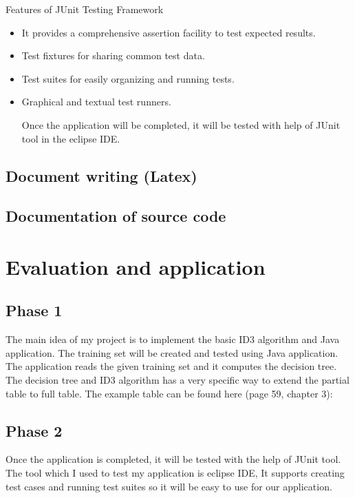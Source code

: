 \documentclass{article}
\begin{document}
Features of JUnit Testing Framework
\begin{itemize}

\item It provides a comprehensive assertion facility to test expected results.
\item Test fixtures for sharing common test data.
\item Test suites for easily organizing and running tests.
\item Graphical and textual test runners.

Once the application will be completed, it will be tested with help of JUnit tool in the eclipse IDE. 


\end{itemize}

\subsection{Document writing (Latex)}
\label{sec:latex}

\subsection{Documentation of source code}
\label{sec:documentsource}


\section{Evaluation and application}
\label{sec:eval}

\subsection{Phase 1}
\label{sec:phase}

The main idea of my project is to implement the basic ID3 algorithm and Java application. The training set will be created and tested using Java application. The application reads the given training set and it computes the decision tree. The decision tree and ID3 algorithm has a very specific way to extend the partial table to full table. The example table can be found here \cite{Mitchell1997MachineLearning}(page 59, chapter 3): 

\subsection{Phase 2}
\label{sec:phase}

Once the application is completed, it will be tested with the help of JUnit tool. The tool which I used to test my application is eclipse IDE, It supports creating test cases and running test suites so it will be easy to use for our application.
\end{document}
